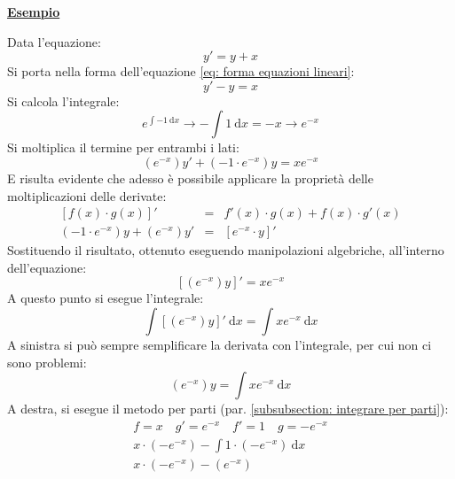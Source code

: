 \documentclass[a4paper]{article}
\newcommand{\example}[1]{\textcolor{Green4}{\textbf{#1}}}
\begin{document}
	\begin{flushleft}
		\example{\underline{Esempio}}
	\end{flushleft}
	Data l'equazione:
	\begin{equation*}
		y' = y + x
	\end{equation*}
	Si porta nella forma dell'equazione \ref{eq: forma equazioni lineari}:
	\begin{equation*}
		y' - y = x
	\end{equation*}
	Si calcola l'integrale:
	\begin{equation*}
		e^{\int -1 \: \mathrm{d}x} \rightarrow -\displaystyle\int 1 \: \mathrm{d}x = -x \rightarrow e^{-x}
	\end{equation*}
	Si moltiplica il termine per entrambi i lati:
	\begin{equation*}
		\left(e^{-x}\right) y' + \left(-1 \cdot e^{-x}\right)y = x e^{-x}
	\end{equation*}
	E risulta evidente che adesso è possibile applicare la proprietà delle moltiplicazioni delle derivate:
	\begin{equation*}
		\begin{array}{rcl}
			\left[f\left(x\right) \cdot g\left(x\right)\right]' &=& f'\left(x\right) \cdot g\left(x\right) + f\left(x\right) \cdot g'\left(x\right) \\ [.3em]
			\left(-1 \cdot e^{-x}\right)y + \left(e^{-x}\right) y' &=& \left[e^{-x} \cdot y\right]'
		\end{array}
	\end{equation*}
	Sostituendo il risultato, ottenuto eseguendo manipolazioni algebriche, all'interno dell'equazione:
	\begin{equation*}
		\left[\left(e^{-x}\right) y\right]' = x e^{-x}
	\end{equation*}
	A questo punto si esegue l'integrale:
	\begin{equation*}
		\displaystyle\int \left[\left(e^{-x}\right) y\right]' \:\mathrm{d}x = \displaystyle\int x e^{-x} \: \mathrm{d}x
	\end{equation*}
	A sinistra si può sempre semplificare la derivata con l'integrale, per cui non ci sono problemi:
	\begin{equation*}
		\left(e^{-x}\right) y = \displaystyle\int x e^{-x} \: \mathrm{d}x
	\end{equation*}
	A destra, si esegue il metodo per parti (par. \ref{subsubsection: integrare per parti}):
	\begin{gather*}
		f = x \hspace{1em} g' = e^{-x} \hspace{1em} f' = 1 \hspace{1em} g = -e^{-x} \\
		x \cdot \left(- e^{-x}\right) - \displaystyle\int 1 \cdot \left(- e^{-x}\right) \: \mathrm{d}x \\
		x \cdot \left(- e^{-x}\right) - \left(e^{-x}\right)
	\end{gather*}
\end{document}
